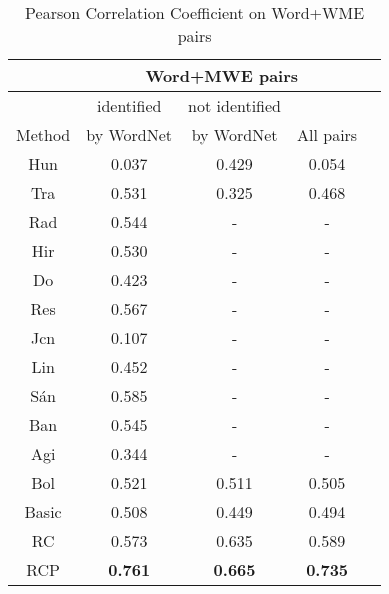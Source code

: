\begin{table}[th]
\centering
\caption{Pearson Correlation Coefficient on Word+WME pairs}
\label{tab:benchmarkData3}
\small{
\begin{tabular}{|c|c|c|c|c|}\hline
  &   \multicolumn{3}{c|}{Word+MWE pairs}\\\hline
    & identified& not identified &   \\
Method & by WordNet &by WordNet & All pairs \\ \hline\hline %
Hun&0.037&0.429&0.054\\ \hline
Tra&0.531&0.325&0.468\\ \hline
Rad	&0.544&-&-\\ \hline
Hir&0.530&-&-\\ \hline
Do&0.423&-&-\\ \hline
Res&0.567&-&-\\ \hline
Jcn&0.107&-&-\\ \hline
Lin&0.452&-&-\\ \hline
S\'{a}n&0.585&-&-\\ \hline
Ban&0.545&-&-\\ \hline
Agi&0.344&-&-\\ \hline
Bol&0.521&0.511&0.505\\ \hline
Basic&0.508 &0.449&0.494\\ \hline
RC&0.573 &0.635&0.589\\ \hline
RCP&\textbf{0.761}&\textbf{0.665}&\textbf{0.735}\\ \hline
\end{tabular}
}
\end{table}
